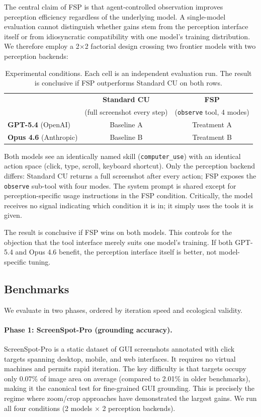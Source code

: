 \documentclass[11pt,a4paper]{article}
\begin{document}
The central claim of FSP is that agent-controlled observation improves perception efficiency regardless of the underlying model. A single-model evaluation cannot distinguish whether gains stem from the perception interface itself or from idiosyncratic compatibility with one model's training distribution. We therefore employ a 2$\times$2 factorial design crossing two frontier models with two perception backends:

\begin{table}[h]
\centering
\caption{Experimental conditions. Each cell is an independent evaluation run. The result is conclusive if FSP outperforms Standard CU on both rows.}
\label{tab:conditions}
\begin{tabular}{lcc}
\toprule
& \textbf{Standard CU} & \textbf{FSP} \\
& (full screenshot every step) & (\texttt{observe} tool, 4 modes) \\
\midrule
\textbf{GPT-5.4} (OpenAI)     & Baseline A  & Treatment A \\
\textbf{Opus 4.6} (Anthropic)  & Baseline B  & Treatment B \\
\bottomrule
\end{tabular}
\end{table}

Both models see an identically named skill (\texttt{computer\_use}) with an identical action space (click, type, scroll, keyboard shortcut). Only the perception backend differs: Standard CU returns a full screenshot after every action; FSP exposes the \texttt{observe} sub-tool with four modes. The system prompt is shared except for perception-specific usage instructions in the FSP condition. Critically, the model receives no signal indicating which condition it is in; it simply uses the tools it is given.

The result is conclusive if FSP wins on both models. This controls for the objection that the tool interface merely suits one model's training. If both GPT-5.4 and Opus 4.6 benefit, the perception interface itself is better, not model-specific tuning.

\subsection{Benchmarks}

We evaluate in two phases, ordered by iteration speed and ecological validity.

\paragraph{Phase 1: ScreenSpot-Pro (grounding accuracy).}
ScreenSpot-Pro \cite{screenspot-pro} is a static dataset of GUI screenshots annotated with click targets spanning desktop, mobile, and web interfaces. It requires no virtual machines and permits rapid iteration. The key difficulty is that targets occupy only 0.07\% of image area on average (compared to 2.01\% in older benchmarks), making it the canonical test for fine-grained GUI grounding. This is precisely the regime where zoom/crop approaches have demonstrated the largest gains. We run all four conditions (2 models $\times$ 2 perception backends).
\end{document}
